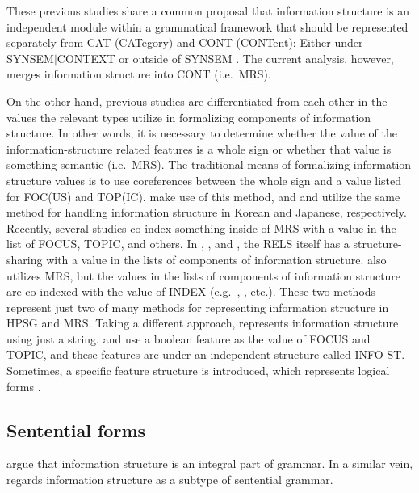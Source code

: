 These previous studies share a common proposal that information
structure is an independent module within a grammatical framework that
should be represented separately from CAT (CATegory) and CONT
(CONTent): Either under SYNSEM{$\mid$}CONTEXT
\citep{engdahl:vallduvi:96,chang:02,ohtani:matsumoto:04,yoshimoto:etal:06,paggio:09}
or outside of SYNSEM \citep{dekuthy:00,chung:etal:03,bildhauer:07}.
The current analysis, however, merges information structure into CONT
(i.e.\ MRS).



On the other hand, previous studies are differentiated from each other
in the values the relevant types utilize in formalizing components of
information structure. In other words, it is necessary to determine
whether the value of the information-structure related features is a
whole sign or whether that value is something semantic
(i.e.\ MRS). The traditional means of formalizing information
structure values is to use coreferences between the whole sign and a
value listed for FOC(US) and TOP(IC). \citet{engdahl:vallduvi:96} make
use of this method, and \citet{chung:etal:03} and
\citet{ohtani:matsumoto:04} utilize the same method for handling
information structure in Korean and Japanese, respectively. Recently,
several studies co-index something inside of MRS with a value in the
list of FOCUS, TOPIC, and others. In \citet{yoshimoto:etal:06},
\citet{bildhauer:07}, and \citet{sato:tam:12}, the RELS itself has a
structure-sharing with a value in the lists of components of
information structure.  \citet{paggio:09} also utilizes MRS,
but the values in the lists of components of information structure are
co-indexed with the value of INDEX (e.g.\ , , etc.).
These two methods represent just two of many methods for representing
information structure in HPSG and MRS. Taking a
different approach, \citet{chang:02} represents information structure
using just a string. \citet{kim:07} and \citet{kim:12a} use a boolean
feature as the value of FOCUS and TOPIC, and these features are under
an independent structure called INFO-ST.  Sometimes, a specific
feature structure is introduced, which represents logical forms
\citep{webelhuth:07,dekuthy:meurers:11}.


\subsection{Sentential forms}
\label{8:ssec:sform}


\citet{engdahl:vallduvi:96} argue that information structure is an
integral part of grammar.  In a similar vein, \citet{lambrecht:96}
regards information structure as a subtype of sentential grammar.


